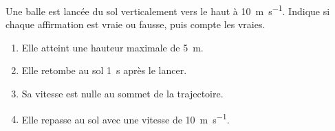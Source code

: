 \documentclass[11pt,a4paper]{article}
\begin{document}
\begin{exo}
Une balle est lancée du sol verticalement vers le haut à \qty{10}{\metre\per\second}. Indique si chaque
affirmation est vraie ou fausse, puis compte les vraies.
\begin{enumerate}[label=\alph*)]
  \item Elle atteint une hauteur maximale de \qty{5}{\metre}.
  \item Elle retombe au sol \qty{1}{\second} après le lancer.
  \item Sa vitesse est nulle au sommet de la trajectoire.
  \item Elle repasse au sol avec une vitesse de \qty{10}{\metre\per\second}.
\end{enumerate}
\end{exo}
\end{document}
